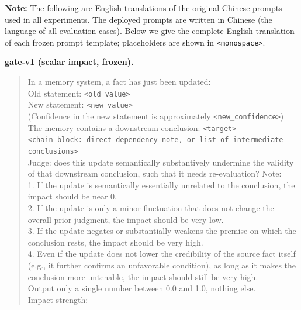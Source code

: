 \documentclass{article}
\theoremstyle{definition}
\begin{document}
\noindent\textbf{Note:} The following are English translations of the
original Chinese prompts used in all experiments. The deployed prompts
are written in Chinese (the language of all evaluation cases).  Below we
give the complete English translation of each frozen prompt template;
placeholders are shown in \texttt{<monospace>}.

\textbf{gate-v1 (scalar impact, frozen).}
\begin{quote}\small
In a memory system, a fact has just been updated:\\
Old statement: \texttt{<old\_value>}\\
New statement: \texttt{<new\_value>}\\
(Confidence in the new statement is approximately
\texttt{<new\_confidence>})\\[2pt]
The memory contains a downstream conclusion: \texttt{<target>}\\
\texttt{<chain block: direct-dependency note, or list of intermediate
conclusions>}\\[2pt]
Judge: does this update semantically substantively undermine the
validity of that downstream conclusion, such that it needs
re-evaluation?  Note:\\
1. If the update is semantically essentially unrelated to the
conclusion, the impact should be near 0.\\
2. If the update is only a minor fluctuation that does not change the
overall prior judgment, the impact should be very low.\\
3. If the update negates or substantially weakens the premise on which
the conclusion rests, the impact should be very high.\\
4. Even if the update does not lower the credibility of the source
fact itself (e.g., it further confirms an unfavorable condition), as
long as it makes the conclusion more untenable, the impact should
still be very high.\\[2pt]
Output only a single number between 0.0 and 1.0, nothing else.\\
Impact strength:
\end{quote}
\end{document}

